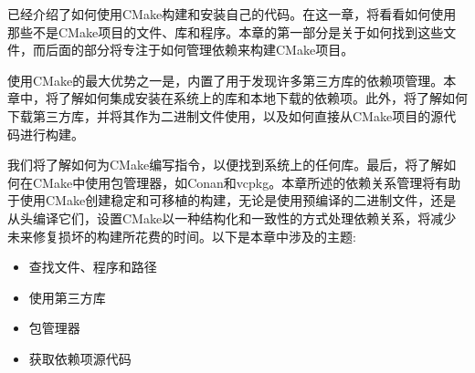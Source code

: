 已经介绍了如何使用CMake构建和安装自己的代码。在这一章，将看看如何使用那些不是CMake项目的文件、库和程序。本章的第一部分是关于如何找到这些文件，而后面的部分将专注于如何管理依赖来构建CMake项目。

使用CMake的最大优势之一是，内置了用于发现许多第三方库的依赖项管理。本章中，将了解如何集成安装在系统上的库和本地下载的依赖项。此外，将了解如何下载第三方库，并将其作为二进制文件使用，以及如何直接从CMake项目的源代码进行构建。

我们将了解如何为CMake编写指令，以便找到系统上的任何库。最后，将了解如何在CMake中使用包管理器，如Conan和vcpkg。本章所述的依赖关系管理将有助于使用CMake创建稳定和可移植的构建，无论是使用预编译的二进制文件，还是从头编译它们，设置CMake以一种结构化和一致性的方式处理依赖关系，将减少未来修复损坏的构建所花费的时间。以下是本章中涉及的主题:

\begin{itemize}
\item 
查找文件、程序和路径

\item 
使用第三方库

\item 
包管理器

\item 
获取依赖项源代码
\end{itemize}













